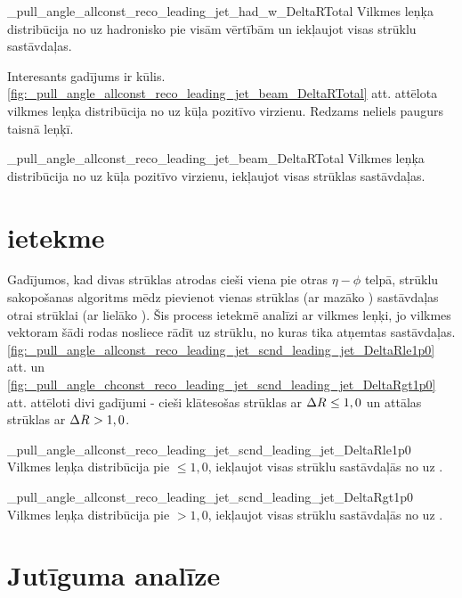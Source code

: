           {_pull_angle_allconst_reco_leading_jet_had_w_DeltaRTotal}
          {Vilkmes leņķa distribūcija no \leadingjet uz hadronisko \PW pie visām \DeltaR vērtībām un iekļaujot visas strūklu sastāvdaļas.}

Interesants gadījums ir kūlis. \ref{fig:_pull_angle_allconst_reco_leading_jet_beam_DeltaRTotal} att. attēlota vilkmes leņķa distribūcija no \leadingjet uz kūļa pozitīvo virzienu. Redzams neliels paugurs taisnā leņķī.

          {_pull_angle_allconst_reco_leading_jet_beam_DeltaRTotal}
          {Vilkmes leņķa distribūcija no \leadingjet uz kūļa pozitīvo virzienu, iekļaujot visas strūklas sastāvdaļas.}

\section{\DeltaR ietekme}

Gadījumos, kad divas strūklas atrodas cieši viena pie otras $\eta-\phi$ telpā, strūklu sakopošanas algoritms mēdz pievienot vienas strūklas (ar mazāko \pt) sastāvdaļas otrai strūklai (ar lielāko \pt). Šis process ietekmē analīzi ar vilkmes leņķi, jo vilkmes vektoram šādi rodas nosliece rādīt uz strūklu, no kuras tika atņemtas sastāvdaļas. \ref{fig:_pull_angle_allconst_reco_leading_jet_scnd_leading_jet_DeltaRle1p0} att. un \ref{fig:_pull_angle_chconst_reco_leading_jet_scnd_leading_jet_DeltaRgt1p0} att. attēloti divi gadījumi - cieši klātesošas strūklas ar $\Delta R^{}\leq1,0$ un attālas strūklas ar $\Delta R^{}>1,0$.

          {_pull_angle_allconst_reco_leading_jet_scnd_leading_jet_DeltaRle1p0}
          {Vilkmes leņķa distribūcija pie \DeltaR$\leq1,0$, iekļaujot visas strūklu sastāvdaļās no \leadingjet uz \scndleadingjet.}

          {_pull_angle_allconst_reco_leading_jet_scnd_leading_jet_DeltaRgt1p0}
          {Vilkmes leņķa distribūcija pie \DeltaR$>1,0$, iekļaujot visas strūklu sastāvdaļās no \leadingjet uz \scndleadingjet.}


\section{Jutīguma analīze}

